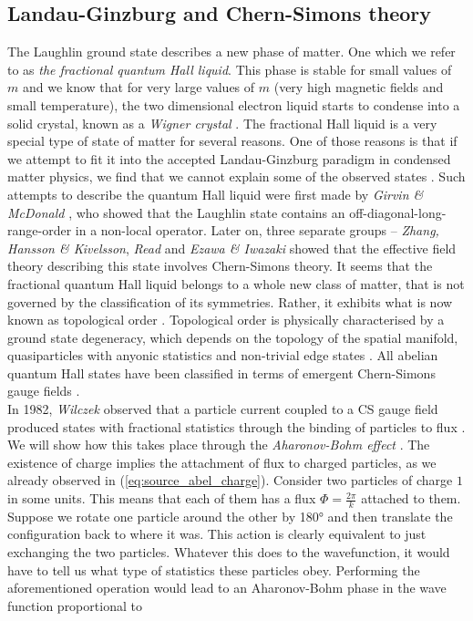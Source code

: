 \subsection{Landau-Ginzburg and Chern-Simons theory}


 The Laughlin ground state describes a new phase of matter. One which we refer to as \textit{the fractional quantum Hall liquid}. This phase is stable for small values of $m$ and we know that for very large values of $m$ (very high magnetic fields and small temperature), the two dimensional electron liquid starts to condense into a solid crystal, known as a \textit{Wigner crystal} \cite{PhysRevLett.60.2765, PhysRev.46.1002, Wigner1938}. The fractional Hall liquid is a very special type of state of matter for several reasons. One of those reasons is that if we attempt to fit it into the accepted Landau-Ginzburg paradigm in condensed matter physics, we find that we cannot explain some of the observed states \cite{wen2004quantum}. Such attempts to describe the quantum Hall liquid were first made by \textit{Girvin \& McDonald} \cite{PhysRevLett.58.1252}, who showed that the Laughlin state contains an off-diagonal-long-range-order in a non-local operator. Later on, three separate groups --  \textit{Zhang, Hansson \& Kivelsson}, \textit{Read} and \textit{Ezawa \& Iwazaki} \cite{PhysRevLett.62.82, PhysRevB.43.2637, Read1989} showed that the effective field theory describing this state involves Chern-Simons theory. It seems that the fractional quantum Hall liquid belongs to a whole new class of matter, that is not governed by the classification of its symmetries. Rather, it exhibits what is now known as topological order \cite{Wen:1995qn, TopOrderRigidStates}. Topological order is physically characterised by a ground state degeneracy, which depends on the topology of the spatial manifold, quasiparticles with anyonic statistics and non-trivial edge states \cite{Wen:1995qn}. All abelian quantum Hall states have been classified in terms of emergent Chern-Simons gauge fields \cite{PhysRevB.46.2290}.\\
\indent In 1982, \textit{Wilczek} observed that a particle current coupled to a CS gauge field produced states with fractional statistics through the binding of particles to flux \cite{Wilczek:1981du}. We will show how this takes place through the \textit{Aharonov-Bohm effect} \cite{Aharonov:1959fk, PhysRevLett.5.3}. The existence of charge implies the attachment of flux to charged particles, as we already observed in (\ref{eq:source_abel_charge}). Consider two particles of charge $1$ in some units. This means that each of them has a flux $\Phi = \frac{2\pi}{k}$ attached to them. Suppose we rotate one particle around the other by 180° and then translate the configuration back to where it was. This action is clearly equivalent to just exchanging the two particles. Whatever this does to the wavefunction, it would have to tell us what type of statistics these particles obey. Performing the aforementioned operation would lead to an Aharonov-Bohm phase in the wave function proportional to
